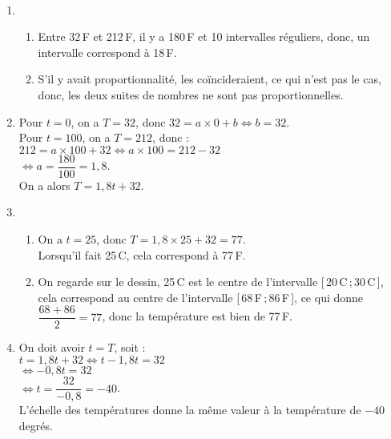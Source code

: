 \ \\ [-4mm]
   \begin{minipage}{11cm}
      \begin{enumerate}
         \item
            \begin{enumerate}
               \item Entre 32\,\degres F et 212\,\degres F, il y a 180\,\degres F et 10 intervalles réguliers, donc, {\blue un intervalle correspond à 18\,\degres F}.
               \item S'il y avait proportionnalité, les  \fg{} coïncideraient, ce qui n'est pas le cas, donc, {\blue les deux suites de nombres ne sont pas proportionnelles.}
            \end{enumerate}
         \setcounter{enumi}{1}
         \item Pour $t =0$, on a $T =32$, donc $32 =a\times0+b \iff b =32$. \\
            Pour $t =100$, on a $T =212$, donc : \\
            $212 =a\times100+32 \iff a\times100 =212-32$ \\ [1mm]
            \hspace*{2.7cm} $\iff a =\dfrac{180}{100} =1,8$. \\ [1mm]
            On a alors {\blue $T =1,8t+32$.}
         \item
            \begin{enumerate}
               \item On a $t =25$, donc $T =1,8\times25+32 =77$. \\
                  {\blue Lorsqu'il fait 25\,\degres C, cela correspond à 77\,\degres F.}
               \item On regarde sur le dessin, 25\,\degres C est le centre de l'intervalle [\,20\,\degres C\,;\,30\,\degres C\,], cela correspond au centre de l'intervalle [\,68\,\degres F\,;\,86\,\degres F\,], ce qui donne $\dfrac{68+86}{2} =77$, donc la température est bien de 77\,\degres F. \\ [-3mm]
            \end{enumerate}
         \setcounter{enumi}{3}
         \item On doit avoir $t =T$, soit : \\
            $t =1,8t+32 \iff t-1,8t =32$ \\
            \hspace*{1.85cm} $\iff -0,8t =32$ \\
            \hspace*{1.85cm} $\iff t =\dfrac{32}{-0,8} =-40$. \\ [1mm]
            {\blue L'échelle des températures donne la même valeur à la température de $-40$ degrés.}
      \end{enumerate}
   \end{minipage}
